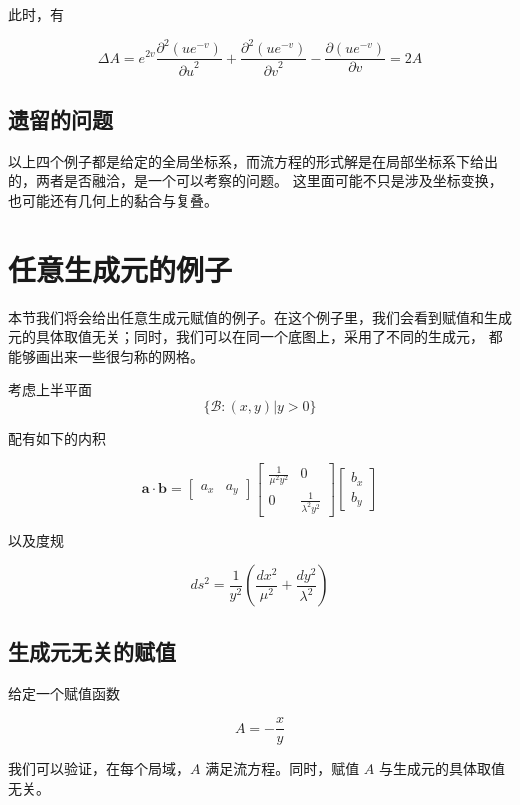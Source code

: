 \documentclass[a4paper,12pt]{article}
\numberwithin{definition}{section}
\numberwithin{lemma}{section}
\numberwithin{proposition}{section}
\numberwithin{theorem}{section}
\numberwithin{grammar}{section}
\numberwithin{program}{section}
\numberwithin{convention}{section}
\numberwithin{corollary}{section}
\begin{document}
此时，有

$$
\Delta A = e^{2v} \frac{\partial^2(u e^{-v})}{{\partial u}^2} + \frac{\partial^2(u e^{-v})}{{\partial v}^2} - \frac{\partial(u e^{-v})}{\partial v} = 2A
$$

\subsection{遗留的问题}

以上四个例子都是给定的全局坐标系，而流方程的形式解是在局部坐标系下给出的，两者是否融洽，是一个可以考察的问题。
这里面可能不只是涉及坐标变换，也可能还有几何上的黏合与复叠。

\newpage

\section{任意生成元的例子}

本节我们将会给出任意生成元赋值的例子。在这个例子里，我们会看到赋值和生成元的具体取值无关；同时，我们可以在同一个底图上，采用了不同的生成元，
都能够画出来一些很匀称的网格。

考虑上半平面
$$
\{\mathcal{B}: (x, y) | y > 0 \}
$$

配有如下的内积

$$
\mathbf{a} \cdot \mathbf{b} = \begin{bmatrix} a_x & a_y \end{bmatrix} \begin{bmatrix} \frac{1}{\mu^2 y^2} & 0 \\ 0 & \frac{1}{\lambda^2 y^2} \end{bmatrix} \begin{bmatrix} b_x \\ b_y \end{bmatrix}
$$

以及度规

$$
ds^2 = \frac{1}{y^2}(\frac{dx^2}{\mu^2} + \frac{dy^2}{\lambda^2})
$$

\subsection{生成元无关的赋值}\label{subsec:exmp6}

给定一个赋值函数

\begin{equation}
A = - \frac{x}{y}
\end{equation}

我们可以验证，在每个局域，$A$ 满足流方程。同时，赋值 $A$ 与生成元的具体取值无关。
\end{document}
